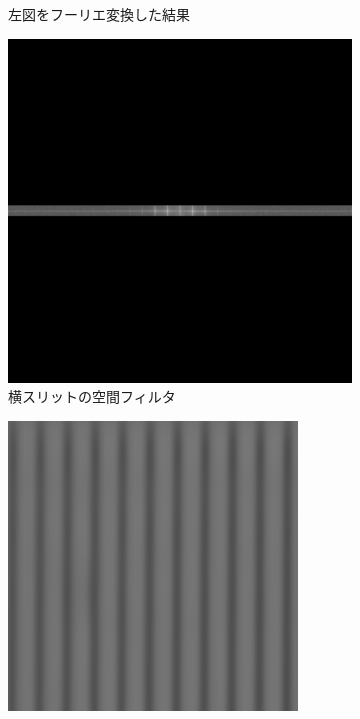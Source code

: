 \documentclass[titlepage]{jsarticle}
\begin{document}
\begin{figure}[htbp]
\begin{subfigure}{0.38\columnwidth}
        \caption{左図をフーリエ変換した結果}
        \label{fig:fourier_vslit}
    \end{subfigure}
    \begin{subfigure}{0.38\columnwidth}
        \centering
        \includegraphics[width=\columnwidth]{20um_blue2_fft_hfilter.png}
        \caption{横スリットの空間フィルタ}
        \label{fig:fourier_hslit_filter}
    \end{subfigure}
    \begin{subfigure}{0.38\columnwidth}
        \centering
        \includegraphics[width=\columnwidth]{20um_blue2_fft_hfilter_fft_tri.png}

\end{subfigure}
\end{figure}
\end{document}
